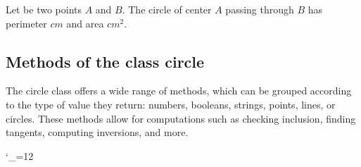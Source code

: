 Let be two points $A$ and $B$.
The circle of center $A$ passing through $B$ has perimeter  $cm$ and area $cm^2$.


\newpage
\subsection{Methods of the class circle}
The circle class offers a wide range of methods, which can be grouped according to the type of value they return: numbers, booleans, strings, points, lines, or circles. These methods allow for computations such as checking inclusion, finding tangents, computing inversions, and more.

\vspace{1em}

\bgroup
\catcode`_=12
\small
{}\label{circle:methods}
